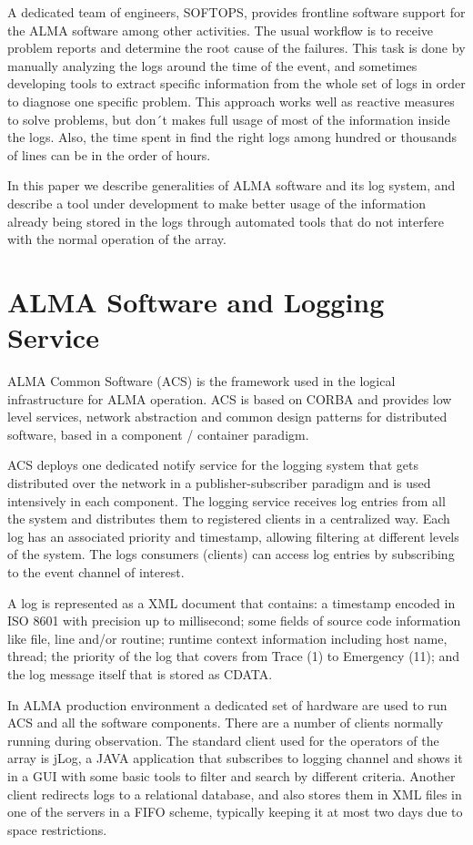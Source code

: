 \documentclass[]{spie}  %
\begin{document}
A dedicated team of engineers, SOFTOPS, provides frontline
software support for the ALMA software among other activities\cite{gonzalez2010first}.
The usual workflow is to receive problem reports and determine the root cause of
the failures. This task is done by manually analyzing the logs around the time of
the event, and sometimes developing tools to extract specific information from
the whole set of logs in order to diagnose one specific problem. This approach
works well as reactive measures to solve problems, but don´t makes full usage
of most of the information inside the logs. Also, the time spent in find the
right logs among hundred or thousands of lines can be in the order of hours.

In this paper we describe generalities of ALMA software and its log system, and
describe a tool under development to make better usage of the information
already being stored in the logs through automated tools that do not interfere
with the normal operation of the array.

\section{ALMA Software and Logging Service}
ALMA Common Software (ACS) is the framework used in the logical infrastructure
for ALMA operation. ACS is based on CORBA and provides low level services,
    network abstraction and common design patterns for distributed software,
    based in a component / container paradigm\cite{schwarz2004alma}.

ACS deploys one dedicated notify service for the logging system that gets
distributed over the network in a publisher-subscriber paradigm and is used
intensively in each component. The logging service receives log entries from
all the system and distributes them to registered clients in a centralized
way. Each log has an associated priority and timestamp, allowing filtering at
different levels of the system. The logs consumers (clients) can access log
entries by subscribing to the event channel of interest.

A log is represented as a XML document that contains: a timestamp encoded in
ISO 8601 with precision up to millisecond; some fields of source code
information like file, line and/or routine; runtime context information
including host name, thread; the priority of the log that covers from Trace (1)
to Emergency (11); and the log message itself that is stored as CDATA\cite{avarias2010introducing}.
 
In ALMA production environment a dedicated set of hardware are used to run ACS
and all the software components. There are a number of clients normally running
during observation. The standard client used for the operators of the array is
jLog, a JAVA application that subscribes to logging channel and shows it in a
GUI with some basic tools to filter and search by different criteria. Another
client redirects logs to a relational database, and also stores them in XML
files in one of the servers in a FIFO scheme, typically keeping it at most two
days due to space restrictions\cite{shen2012alma}.
\end{document}
